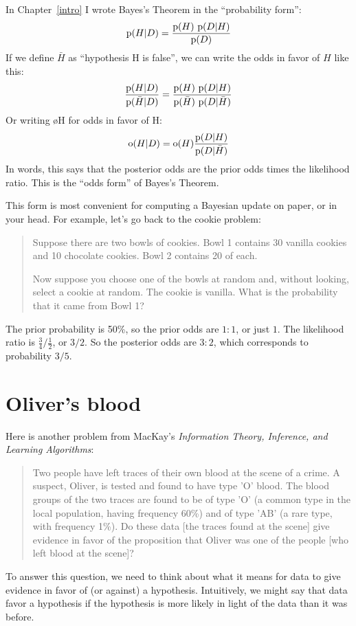 \documentclass[12pt]{book}
\begin{document}
In Chapter~\ref{intro} I wrote Bayes's Theorem in the ``probability
form'':
%
\[ \mathrm{p}(H|D) = \frac{\mathrm{p}(H)~\mathrm{p}(D|H)}{\mathrm{p}(D)} \]
%
If we define $\bar{H}$ as ``hypothesis H is false'', we can write the
odds in favor of $H$ like this:
%
\[ \frac{\mathrm{p}(H|D)}{\mathrm{p}(\bar{H}|D)} = \frac{\mathrm{p}(H)~\mathrm{p}(D|H)}
                                        {\mathrm{p}(\bar{H})~\mathrm{p}(D|\bar{H})} \]
%
Or writing \o{H} for odds in favor of H:
%
\[ \mathrm{o}(H|D) = \mathrm{o}(H) \frac{\mathrm{p}(D|H)}{\mathrm{p}(D|\bar{H})} \]
%
In words, this says that the posterior odds are the prior odds times
the likelihood ratio.  This is the ``odds form'' of Bayes's Theorem.

This form is most convenient for computing a Bayesian update on
paper, or in your head.  For example, let's go back to the
cookie problem:

\begin{quote}
Suppose there are two bowls of cookies.  Bowl 1 contains
  30 vanilla cookies and 10 chocolate cookies.  Bowl 2 contains 20 of
  each.

Now suppose you choose one of the bowls at random and, without looking,
select a cookie at random.  The cookie is vanilla.  What is the probability
that it came from Bowl 1?
\end{quote}

The prior probability is 50\%, so the prior odds are $1:1$, or just
$1$.  The likelihood ratio is $\frac{3}{4} / \frac{1}{2}$, or $3/2$.
So the posterior odds are $3:2$, which corresponds to probability
$3/5$.


\section{Oliver's blood}
\label{evidence}

Here is another problem from MacKay's {\it Information Theory,
  Inference, and Learning Algorithms}:

\begin{quote}
Two people have left traces of their own blood at the scene of
a crime.  A suspect, Oliver, is tested and found to have type
'O' blood.  The blood groups of the two traces are found to
be of type 'O' (a common type in the local population, having frequency
60\%) and of type 'AB' (a rare type, with frequency 1\%).
Do these data [the traces found at the scene] give evidence
in favor of the proposition that Oliver was one of the people
[who left blood at the scene]?
\end{quote}

To answer this question, we need to think about what it means
for data to give evidence in favor of (or against) a hypothesis.
Intuitively, we might say that data favor a hypothesis if the
hypothesis is more likely in light of the data than it was before.
\end{document}
